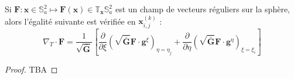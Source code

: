 \begin{proposition}
Si $\mathbf{F} : \mathbf{x} \in \mathbb{S}_a^2 \mapsto \mathbf{F}(\mathbf{x}) \in \mathbb{T}_{\mathbf{x}} \mathbb{S}_a^2$ est un champ de vecteurs réguliers sur la sphère, alors l'égalité suivante est vérifiée en $\mathbf{x}_{i,j}^{(k)}$ :
\begin{equation}
\nabla_T \cdot \mathbf{F} = \dfrac{1}{\sqrt{\bar{\mathbf{G}}}} \left[ \dfrac{\partial}{\partial \xi} \left( \sqrt{\bar{\mathbf{G}}} \mathbf{F} \cdot \mathbf{g}^{\xi} \right)_{\eta = \eta_j} + 
\dfrac{\partial}{\partial \eta} \left( \sqrt{\bar{\mathbf{G}}} \mathbf{F} \cdot \mathbf{g}^{\eta} \right)_{\xi = \xi_i}
\right]
\label{eq:divergence_v2}
\end{equation}
\end{proposition}

\begin{proof}
TBA
\end{proof}


